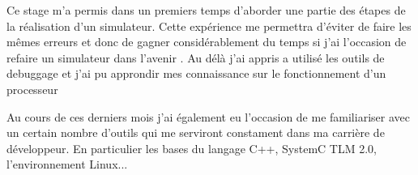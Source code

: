 Ce stage m'a permis dans un premiers temps d'aborder une partie des étapes de la réalisation d'un simulateur. 
Cette expérience me permettra d'éviter de faire les mêmes erreurs et donc de gagner considérablement du temps si j'ai l'occasion de refaire 
un simulateur dans l'avenir . Au délà j'ai appris a utilisé les outils de debuggage et j'ai pu approndir mes connaissance sur le fonctionnement d'un processeur

Au cours de ces derniers mois j'ai également eu l'occasion de me familiariser avec un certain nombre d'outils qui me serviront constament dans ma carrière de 
développeur. En particulier les bases du langage C++, SystemC TLM 2.0, l'environnement Linux...